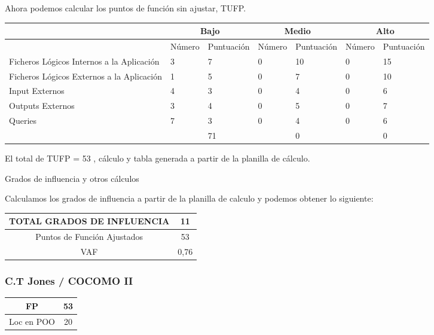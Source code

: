    Ahora podemos calcular los puntos de función sin ajustar, TUFP.
   
   \begin{longtable}{|p{3cm}|p{1.5cm}|p{1.9cm}|p{1.5cm}|p{1.9cm}|p{1.5cm}|p{1.9cm}|}
   \hline 
     & \multicolumn{2}{c|}{Bajo} & \multicolumn{2}{c|}{Medio} & \multicolumn{2}{c|}{Alto} \\ 
   \hline 
     & Número & Puntuación & Número & Puntuación & Número & Puntuación \\ 
   \hline 
   Ficheros Lógicos Internos a la Aplicación & 3 & 7 & 0 & 10 & 0 & 15 \\ 
   \hline 
   Ficheros Lógicos Externos a la Aplicación
    & 1 & 5 & 0 & 7 & 0 & 10 \\ 
   \hline 
   Input Externos & 4 & 3 & 0 & 4 & 0 & 6 \\ 
   \hline 
   Outputs Externos
    & 3 & 4 & 0 & 5 & 0 & 7 \\ 
   \hline 
   Queries & 7 & 3 & 0 & 4 & 0 & 6 \\ 
   \hline 
     &   & 71 &   & 0 &   & 0 \\ 
   \hline 
   \end{longtable} 
   
   El total de TUFP = 53 , cálculo y tabla generada a partir de la planilla de cálculo.
   
   Grados de influencia y otros cálculos
   
   Calculamos los grados de influencia a partir de la planilla de calculo y podemos obtener lo siguiente:
   
   \begin{longtable}{|c|c|}
   \hline 
   TOTAL GRADOS DE INFLUENCIA & 11 \\ 
   \hline 
   Puntos de Función Ajustados & 53 \\ 
   \hline 
   VAF & 0,76 \\ 
   \hline 
   \end{longtable} 
   
\subsubsection{C.T Jones / COCOMO II}

\begin{longtable}{|c|c|}
\hline 
FP & 53 \\ 
\hline 
Loc en POO  & 20 \\ 
\hline 
\end{longtable} 

